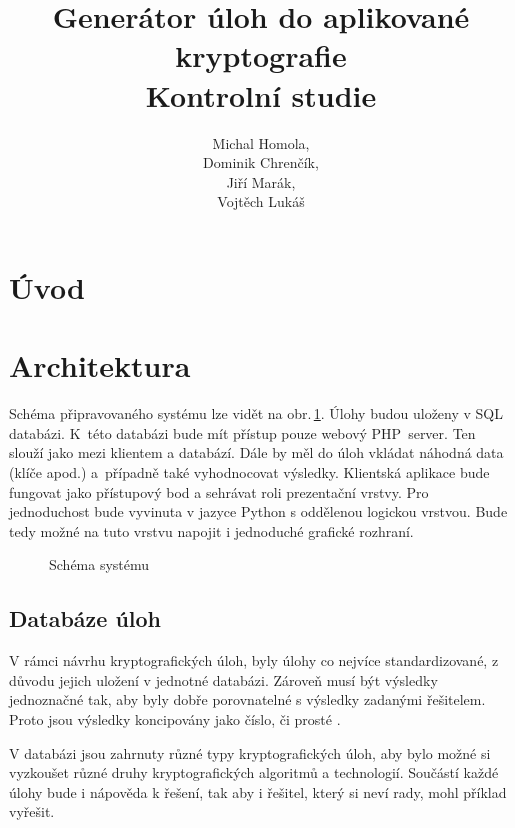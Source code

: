 \documentclass[titlepage]{article}
\title{Generátor úloh do aplikované kryptografie\\Kontrolní studie}
\author{Michal Homola,\\Dominik Chrenčík,\\Jiří Marák,\\Vojtěch Lukáš}
\begin{document}
\maketitle

\tableofcontents

\section*{Úvod}

\section{Architektura}
Schéma připravovaného systému lze vidět na obr.\,\ref{fig:sys}. Úlohy budou uloženy v SQL databázi. K~této databázi bude mít přístup pouze webový PHP~server. Ten slouží jako  mezi klientem a databází. Dále by měl do úloh vkládat náhodná data (klíče apod.) a~případně také vyhodnocovat výsledky. 
Klientská aplikace bude fungovat jako přístupový bod a sehrávat roli prezentační vrstvy. Pro jednoduchost bude vyvinuta v jazyce Python s oddělenou logickou vrstvou. Bude tedy možné na tuto vrstvu napojit i jednoduché grafické rozhraní. 
\begin{figure}[h!]
    \centering
        
    \caption{Schéma systému}
    \label{fig:sys}
\end{figure}




\subsection{Databáze úloh}

V rámci návrhu kryptografických úloh, byly úlohy co nejvíce standardizované, z důvodu jejich uložení v jednotné databázi. Zároveň musí být výsledky jednoznačné tak, aby byly dobře porovnatelné s výsledky zadanými řešitelem. Proto jsou výsledky koncipovány jako číslo, či prosté .      

 V databázi jsou zahrnuty různé typy kryptografických úloh, aby bylo možné si vyzkoušet různé druhy kryptografických algoritmů a technologií. Součástí každé úlohy bude i nápověda k řešení, tak aby i řešitel, který si neví rady, mohl příklad vyřešit.
\end{document}
